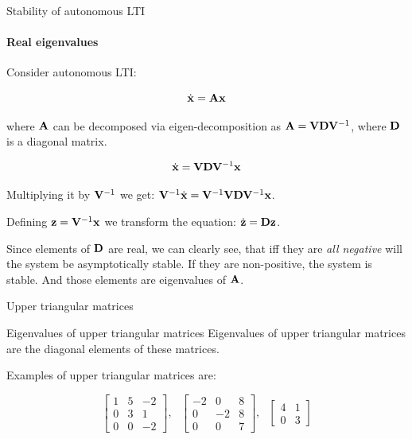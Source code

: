 \documentclass{beamer}
\begin{document}
\begin{frame}{Stability of autonomous LTI}
\framesubtitle{Real eigenvalues}
\begin{flushleft}

Consider autonomous LTI:

\begin{equation}
    \dot{\mathbf{x}} = \mathbf{A} \mathbf{x}
\end{equation}

where $\mathbf{A}$ can be decomposed via eigen-decomposition as $\mathbf{A} = \mathbf{V} \mathbf{D} \mathbf{V}^{-1}$, where $\mathbf{D}$ is a diagonal matrix. 

\bigskip

\begin{equation}
    \dot{\mathbf{x}} = \mathbf{V} \mathbf{D} \mathbf{V}^{-1} \mathbf{x}
\end{equation}

Multiplying it by $\mathbf{V}^{-1}$ 
we get: 
$\mathbf{V}^{-1} \dot{\mathbf{x}} = \mathbf{V}^{-1} \mathbf{V} \mathbf{D} \mathbf{V}^{-1} \mathbf{x}$.

Defining $\mathbf{z} = \mathbf{V}^{-1} \mathbf{x}$ we transform the equation: 
$\dot{\mathbf{z}} = \mathbf{D} \mathbf{z}$.

\bigskip

Since elements of $\mathbf{D}$ are real, we can clearly see, that iff they are \emph{all negative} will the system be asymptotically stable. If they are non-positive, the system is stable. And those elements are eigenvalues of $\mathbf{A}$.

\end{flushleft}
\end{frame}




\begin{frame}{Upper triangular matrices}
	\begin{flushleft}
		
		\begin{block}{Eigenvalues of upper triangular matrices}
			Eigenvalues of upper triangular matrices are the diagonal elements of these matrices.
		\end{block}
		
		\bigskip
		
		Examples of upper triangular matrices are:
		
		\begin{equation}
			\begin{bmatrix}
				1 & 5 & -2 \\
				0 & 3 & 1 \\
				0 & 0 & -2
			\end{bmatrix},
		\ \ \ 
		\begin{bmatrix}
			-2 & 0 & 8 \\
			0 & -2 & 8 \\
			0 & 0 & 7
		\end{bmatrix},
	\ \ \ 
		\begin{bmatrix}
			4 & 1 \\
			0 & 3
		\end{bmatrix}
		\end{equation}
		
		
	\end{flushleft}
\end{frame}
\end{document}
